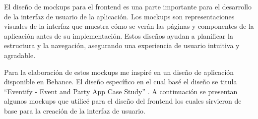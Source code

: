 El diseño de mockups para el frontend es una parte importante para el desarrollo de la interfaz de usuario de la aplicación. Los mockups son representaciones visuales de la interfaz que muestra cómo se verán las páginas y componentes de la aplicación antes de su implementación. Estos diseños ayudan a planificar la estructura y la navegación, asegurando una experiencia de usuario intuitiva y agradable. 

Para la elaboración de estos mockups me inspiré en un diseño de aplicación disponible en Behance. El diseño específico en el cual basé el diseño se titula “Eventify - Event and Party App Case Study” \cite{polina_rusenova}. A continuación se presentan algunos mockups que utilicé para el diseño del frontend los cuales sirvieron de base para la creación de la interfaz de usuario.

